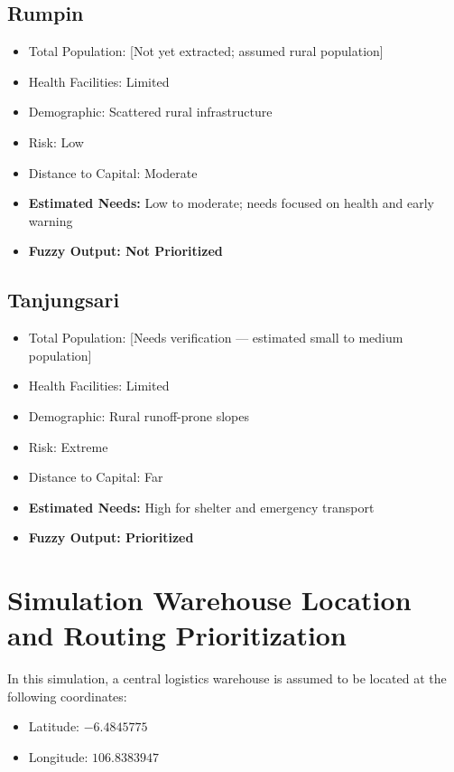 \documentclass[journal,final,a4paper,twoside,11pt]{IEEEtran}
\begin{document}
\subsection{Rumpin}
\begin{itemize}
    \item Total Population: [Not yet extracted; assumed rural population]
    \item Health Facilities: Limited
    \item Demographic: Scattered rural infrastructure
    \item Risk: Low
    \item Distance to Capital: Moderate
    \item \textbf{Estimated Needs:} Low to moderate; needs focused on health and early warning
    \item \textbf{Fuzzy Output: Not Prioritized}
\end{itemize}

\subsection{Tanjungsari}
\begin{itemize}
    \item Total Population: [Needs verification — estimated small to medium population]
    \item Health Facilities: Limited
    \item Demographic: Rural runoff-prone slopes
    \item Risk: Extreme
    \item Distance to Capital: Far
    \item \textbf{Estimated Needs:} High for shelter and emergency transport
    \item \textbf{Fuzzy Output: Prioritized}
\end{itemize}


\section*{Simulation Warehouse Location and Routing Prioritization}

In this simulation, a central logistics warehouse is assumed to be located at the following coordinates:

\begin{itemize}
    \item Latitude: $-6.4845775$
    \item Longitude: $106.8383947$
\end{itemize}
\end{document}
